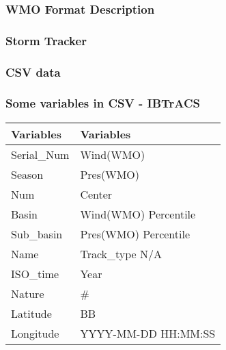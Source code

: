 \documentclass[12pt]{beamer}\usepackage[]{graphicx}\usepackage[]{color}
\begin{document}

\begin{frame}
\frametitle{WMO Format Description}
\begin{center}

{}
\end{center}
\end{frame}


\begin{frame}
\frametitle{Storm Tracker}
\begin{center}
\end{center}
\end{frame}


\begin{frame}
\frametitle{CSV data}
\begin{center}
\end{center}
\end{frame}


\begin{frame}
\frametitle{Some variables in CSV - IBTrACS}

\begin{center}
\begin{tabular}{l l}
  \hline
  Variables & Variables \\
  \hline
  Serial\_Num & Wind(WMO) \\
  Season & Pres(WMO) \\
  Num & Center \\
  Basin & Wind(WMO) Percentile \\
  Sub\_basin & Pres(WMO) Percentile \\
  Name & Track\_type N/A \\
  ISO\_time & Year \\
  Nature & \# \\
  Latitude & BB \\
  Longitude & YYYY-MM-DD HH:MM:SS \\
  \hline
\end{tabular}
\end{center}

\end{frame}
\end{document}

